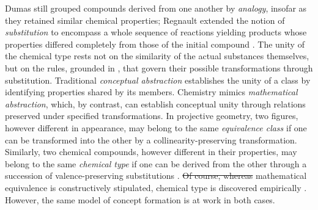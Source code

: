 \documentclass[submitted,12pt]{article}
\providecommand{\DIFadd}[1]{{\protect\color{blue}\uwave{#1}}} %
\providecommand{\DIFdel}[1]{{\protect\color{red}\sout{#1}}}                      %
\providecommand{\DIFaddbegin}{} %
\providecommand{\DIFaddend}{} %
\providecommand{\DIFdelbegin}{} %
\providecommand{\DIFdelend}{} %
\begin{document}
Dumas still grouped compounds derived from one another by \emph{analogy}, insofar as they retained similar chemical properties; Regnault extended the notion of \emph{substitution} to encompass a whole sequence of reactions yielding products whose properties differed completely from those of the initial compound . The unity of the chemical type rests not on the similarity of the actual substances themselves, but on the rules, grounded in , that govern their possible transformations through substitution. Traditional \emph{conceptual abstraction} establishes the unity of a class by identifying properties shared by its members. Chemistry mimics \emph{mathematical abstraction}, which, by contrast, can establish conceptual unity through relations preserved under specified transformations. In projective geometry, two figures, however different in appearance, may belong to the same \emph{equivalence class} if one can be transformed into the other by a collinearity-preserving transformation. Similarly, two chemical compounds, however different in their properties, may belong to the same \emph{chemical type} if one can be derived from the other through a succession of valence-preserving substitutions . \DIFdelbegin \DIFdel{Of course,  whereas }\DIFdelend \DIFaddbegin \DIFadd{Whereas }\DIFaddend mathematical equivalence is constructively stipulated, chemical type is discovered empirically . However, the same model of concept formation is at work in both cases.
\end{document}
